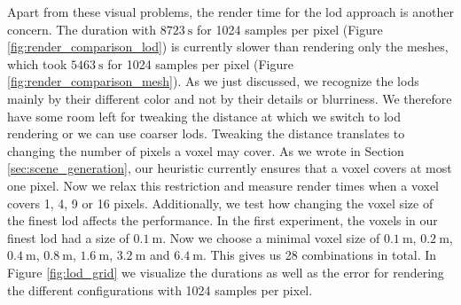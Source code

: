 Apart from these visual problems, the render time for the \ac{lod} approach is another concern.
The duration with $\SI{8723}{\s}$ for 1024 samples per pixel (Figure \ref{fig:render_comparison_lod}) is currently slower than rendering only the meshes, which took $\SI{5463}{\s}$ for 1024 samples per pixel (Figure \ref{fig:render_comparison_mesh}).
As we just discussed, we recognize the \acsp{lod} mainly by their different color and not by their details or blurriness.
We therefore have some room left for tweaking the distance at which we switch to \ac{lod} rendering or we can use coarser \acsp{lod}.
Tweaking the distance translates to changing the number of pixels a voxel may cover.
As we wrote in Section \ref{sec:scene_generation}, our heuristic currently ensures that a voxel covers at most one pixel.
Now we relax this restriction and measure render times when a voxel covers 1, 4, 9 or 16 pixels.
Additionally, we test how changing the voxel size of the finest \ac{lod} affects the performance.
In the first experiment, the voxels in our finest \ac{lod} had a size of $\SI{0.1}{\m}$.
Now we choose a minimal voxel size of $\SI{0.1}{\m}$, $\SI{0.2}{\m}$, $\SI{0.4}{\m}$, $\SI{0.8}{\m}$, $\SI{1.6}{\m}$, $\SI{3.2}{\m}$ and $\SI{6.4}{\m}$.
This gives us 28 combinations in total.
In Figure \ref{fig:lod_grid} we visualize the durations as well as the \FLIP error for rendering the different configurations with 1024 samples per pixel.
